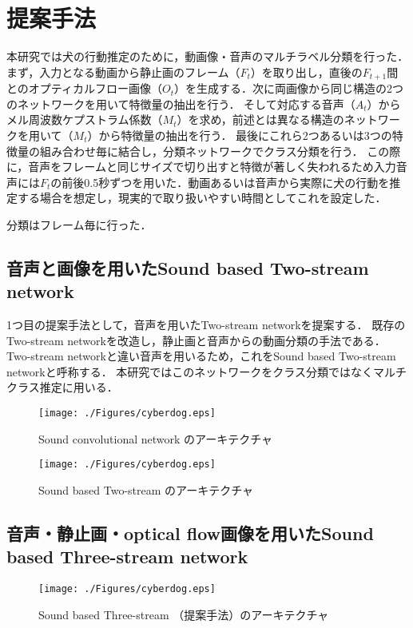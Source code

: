 \chapter{提案手法}
本研究では犬の行動推定のために，動画像・音声のマルチラベル分類を行った．
まず，入力となる動画から静止画のフレーム（$F_t$）を取り出し，直後の$F_{t+1}$間とのオプティカルフロー画像（$O_t$）を生成する．次に両画像から同じ構造の2つのネットワークを用いて特徴量の抽出を行う．
そして対応する音声（$A_t$）からメル周波数ケプストラム係数（$M_t$）を求め，前述とは異なる構造のネットワークを用いて（$M_t$）から特徴量の抽出を行う．
最後にこれら2つあるいは3つの特徴量の組み合わせ毎に結合し，分類ネットワークでクラス分類を行う．
この際に，音声をフレームと同じサイズで切り出すと特徴が著しく失われるため入力音声には$F_t$の前後0.5秒ずつを用いた．動画あるいは音声から実際に犬の行動を推定する場合を想定し，現実的で取り扱いやすい時間としてこれを設定した．

分類はフレーム毎に行った．
\section{音声と画像を用いたSound based Two-stream network}
1つ目の提案手法として，音声を用いたTwo-stream networkを提案する．
既存のTwo-stream networkを改造し，静止画と音声からの動画分類の手法である．
Two-stream networkと違い音声を用いるため，これをSound based Two-stream networkと呼称する．
本研究ではこのネットワークをクラス分類ではなくマルチクラス推定に用いる．

\begin{figure}[htbp]
 \begin{center}
  \texttt{[image: ./Figures/cyberdog.eps]}
  \caption{Sound convolutional network のアーキテクチャ}
  \label{sound-network}
 \end{center}
\end{figure}

\begin{figure}[htbp]
 \begin{center}
  \texttt{[image: ./Figures/cyberdog.eps]}
  \caption{Sound based Two-stream のアーキテクチャ}
  \label{sound-two-stream}
 \end{center}
\end{figure}



\section{音声・静止画・optical flow画像を用いたSound based Three-stream network}

\begin{figure}[htbp]
 \begin{center}
  \texttt{[image: ./Figures/cyberdog.eps]}
  \caption{Sound based Three-stream （提案手法）のアーキテクチャ}
  \label{sound-three-stream}
 \end{center}
\end{figure}
